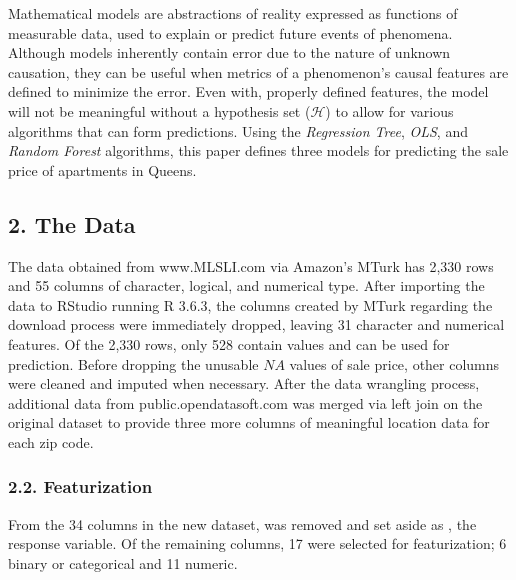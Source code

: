 \documentclass[12pt]{article}
\begin{document}
Mathematical models are abstractions of reality expressed as functions of measurable data, used to explain or predict future events of phenomena. Although models inherently contain error due to the nature of unknown causation, they can be useful when metrics of a phenomenon's causal features are defined to minimize the error. Even with, properly defined features, the model will not be meaningful without a hypothesis set ($\mathcal{H}$) to allow for various algorithms that can form predictions. Using the \emph{Regression Tree}, \emph{OLS}, and \emph{Random Forest} algorithms, this paper defines three models for predicting the sale price of apartments in Queens.




\subsection*{2. The Data}

The data obtained from www.MLSLI.com via Amazon's MTurk has 2,330 rows and 55 columns of character, logical, and numerical type. After importing the data to RStudio running R 3.6.3, the columns created by MTurk regarding the download process were immediately dropped, leaving 31 character and numerical features. Of the 2,330 rows, only 528 contain values and can be used for prediction. Before dropping the unusable $NA$ values of sale price, other columns were cleaned and imputed when necessary. After the data wrangling process, additional data from public.opendatasoft.com was merged via left join on the original dataset to provide three more columns of meaningful location data for each zip code.




\subsubsection*{2.2. Featurization}


From the 34 columns in the new dataset,  was removed and set aside as , the response variable. Of the remaining columns, 17 were selected for featurization; 6 binary or categorical and 11 numeric. 
\end{document}
